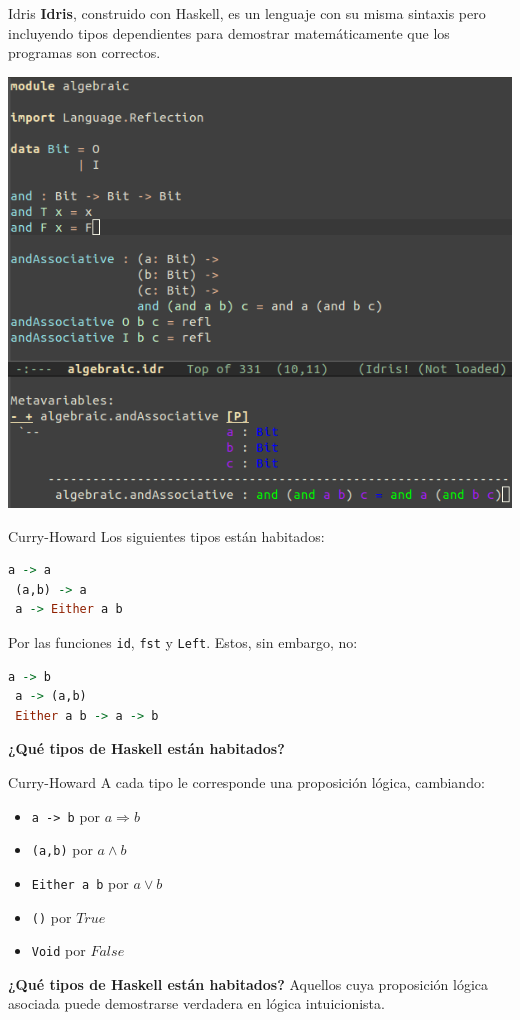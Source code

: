 \begin{frame}[fragile]{Idris}
  \textbf{Idris}, construido con Haskell, es un lenguaje
  con su misma sintaxis pero incluyendo tipos dependientes
  para demostrar matemáticamente que los programas son correctos.

  \begin{center}
  \includegraphics[scale=0.28]{./images/idris.png}
  \end{center}
\end{frame}


\begin{frame}[fragile]{Curry-Howard}
 Los siguientes tipos están habitados:
 \begin{lstlisting}[language=haskell]
 a -> a
 (a,b) -> a
 a -> Either a b
 \end{lstlisting}
 Por las funciones \texttt{id}, \texttt{fst} y \texttt{Left}.
 Estos, sin embargo, no:
 \begin{lstlisting}[language=haskell]
 a -> b
 a -> (a,b)
 Either a b -> a -> b
 \end{lstlisting}

 \textbf{¿Qué tipos de Haskell están habitados?}
\end{frame}


\begin{frame}[fragile]{Curry-Howard}
 A cada tipo le corresponde una proposición lógica, cambiando:
 \begin{itemize}
  \item \texttt{a -> b} por $a \Rightarrow b$
  \item \texttt{(a,b)} por $a \wedge b$
  \item \texttt{Either a b} por $a \vee b$
  \item \texttt{()} por $True$
  \item \texttt{Void} por $False$
 \end{itemize}

 \espacio
 \textbf{¿Qué tipos de Haskell están habitados?} Aquellos cuya
 proposición lógica asociada puede demostrarse verdadera en lógica
 intuicionista.
\end{frame}

